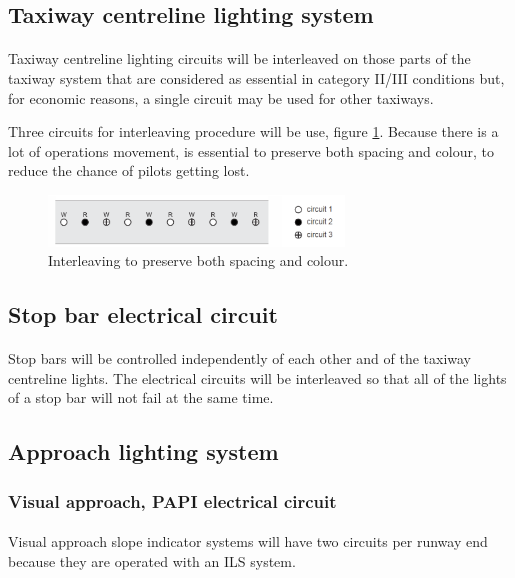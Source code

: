		
		\subsection{Taxiway centreline lighting system}
		\paragraph{} Taxiway centreline lighting circuits will be interleaved on those parts of the taxiway system that are considered as essential in category II/III conditions but, for economic reasons, a single circuit may be used for other taxiways.
		
		Three circuits for interleaving procedure will be use, figure \ref{inter3}. Because there is a lot of operations movement, is essential to preserve both spacing and colour, to reduce the chance of pilots getting lost.
		
		\begin{figure}[H]
			\centering
			\includegraphics[clip, trim=0cm 0cm 0cm 0cm, width=0.7\textwidth]{./images/electric/inter3}
			\caption{Interleaving to preserve both spacing and colour.}
			\label{inter3}
		\end{figure}
		
		\subsection{Stop bar electrical circuit}
		\paragraph{} Stop bars will be controlled independently of each other and of the taxiway centreline lights. The electrical circuits will be interleaved so that all of the lights of a stop bar will not fail at the same time.
		
		\subsection{Approach lighting system}
		
			\subsubsection{Visual approach, PAPI electrical circuit}
			\paragraph{} Visual approach slope indicator systems will have two circuits per runway end because they are operated with an ILS system.
			
